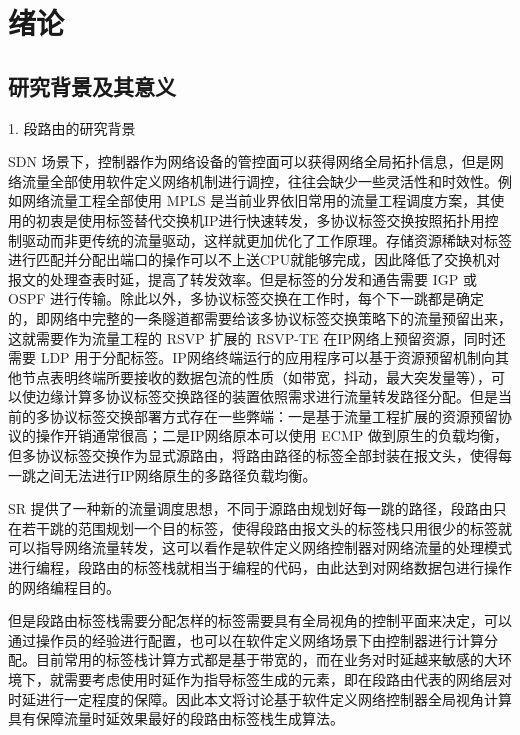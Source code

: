 
\chapter{绪论}
\section{研究背景及其意义}

1. 段路由的研究背景

\gls*{SDN} 场景下，控制器作为网络设备的管控面可以获得网络全局拓扑信息，但是网络流量全部使用软件定义网络机制进行调控，往往会缺少一些灵活性和时效性。例如网络流量工程全部使用 \gls*{MPLS} 是当前业界依旧常用的流量工程调度方案，其使用的初衷是使用标签替代交换机IP进行快速转发，多协议标签交换按照拓扑用控制驱动而非更传统的流量驱动，这样就更加优化了工作原理。存储资源稀缺对标签进行匹配并分配出端口的操作可以不上送CPU就能够完成，因此降低了交换机对报文的处理查表时延，提高了转发效率。但是标签的分发和通告需要 \gls*{IGP} 或 \gls*{OSPF} 进行传输。除此以外，多协议标签交换在工作时，每个下一跳都是确定的，即网络中完整的一条隧道都需要给该多协议标签交换策略下的流量预留出来，这就需要作为流量工程的 \gls*{RSVP} 扩展的 \gls*{RSVP-TE} 在IP网络上预留资源，同时还需要 \gls*{LDP} 用于分配标签。IP网络终端运行的应用程序可以基于资源预留机制向其他节点表明终端所要接收的数据包流的性质（如带宽，抖动，最大突发量等），可以使边缘计算多协议标签交换路径的装置依照需求进行流量转发路径分配。但是当前的多协议标签交换部署方式存在一些弊端：一是基于流量工程扩展的资源预留协议的操作开销通常很高；二是IP网络原本可以使用 \gls*{ECMP} 做到原生的负载均衡，但多协议标签交换作为显式源路由，将路由路径的标签全部封装在报文头，使得每一跳之间无法进行IP网络原生的多路径负载均衡。

\gls*{SR} 提供了一种新的流量调度思想，不同于源路由规划好每一跳的路径，段路由只在若干跳的范围规划一个目的标签，使得段路由报文头的标签栈只用很少的标签就可以指导网络流量转发，这可以看作是软件定义网络控制器对网络流量的处理模式进行编程，段路由的标签栈就相当于编程的代码，由此达到对网络数据包进行操作的网络编程目的。

但是段路由标签栈需要分配怎样的标签需要具有全局视角的控制平面来决定，可以通过操作员的经验进行配置，也可以在软件定义网络场景下由控制器进行计算分配。目前常用的标签栈计算方式都是基于带宽的，而在业务对时延越来敏感的大环境下，就需要考虑使用时延作为指导标签生成的元素，即在段路由代表的网络层对时延进行一定程度的保障。因此本文将讨论基于软件定义网络控制器全局视角计算具有保障流量时延效果最好的段路由标签栈生成算法。


